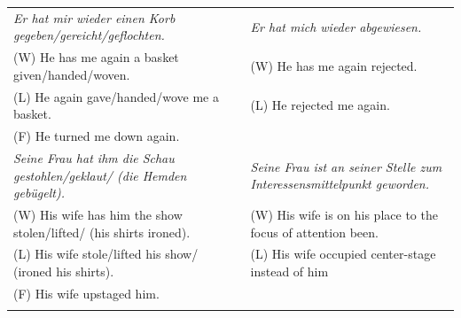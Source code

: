 \documentclass[output=paper]{langsci/langscibook}
\begin{document}
\begin{table}
\begin{tabularx}{\textwidth}{QQ}
\textit{Er hat mir wieder einen Korb gegeben/gereicht/geflochten.}              & \textit{Er hat mich wieder abgewiesen.}                                       \\
\hspace{3mm}(W) He has me again a basket given/handed/woven.                                & \hspace{3mm}(W) He has me again rejected.                                                 \\
\hspace{3mm}(L) He again gave/handed/wove me a basket.                                      & \hspace{3mm}(L) He rejected me again.                                                     \\
\hspace{3mm}(F) He turned me down again.                                                    &                                                                               \\ \tablevspace
\textit{Seine Frau hat ihm die Schau gestohlen/geklaut/ (die Hemden gebügelt).} & \textit{Seine Frau ist an seiner Stelle zum Interessensmittelpunkt geworden.} \\
\hspace{3mm}(W) His wife has him the show stolen/lifted/ (his shirts ironed).               & \hspace{3mm}(W) His wife is on his place to the focus of attention been.                  \\
\hspace{3mm}(L) His wife stole/lifted his show/ (ironed his shirts).                        & \hspace{3mm}(L) His wife occupied center-stage instead of him                             \\
\hspace{3mm}(F) His wife upstaged him.                                                      &                                                                               \\ \lspbottomrule
\end{tabularx}
\end{table}
\end{document}
